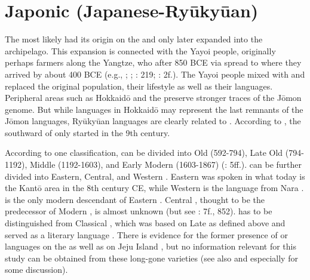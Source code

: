 \section{Japonic (Japanese-Ryūkyūan)}\label{sec:2.6}

The   most likely had its origin on the  and only later expanded into the  archipelago. This expansion is connected with the Yayoi people, originally perhaps farmers along the Yangtze, who after 850 BCE via  spread to  where they arrived by about 400 BCE (e.g., \citealt{Janhunen2003e}; \citealt{LeeHasegawa2011}; \citealt{MatsumuraOxenham2013}: 219; \citealt{Siska2017}: 2f.). The Yayoi people mixed with and replaced the original  population, their  lifestyle as well as their languages. Peripheral areas such as Hokkaid\=o and the  preserve stronger traces of the J\=omon genome. But while  languages in Hokkaid\=o may represent the last remnants of the J\=omon languages, Ryūkyūan languages are clearly related to . According to \citet[202]{Vovin2013a}, the southward  of  only started in the 9th century.

According to one classification,  can be divided into Old (592-794), Late Old (794-1192), Middle (1192-1603), and Early Modern  (1603-1867) (\citealt{Hasegawa2015}: 5ff.).  can be further divided into Eastern, Central, and Western . Eastern  was spoken in what today is the Kant\=o area in the 8th century CE, while Western  is the language from Nara \citep{Kupchik2011}.  is the only modern descendant of Eastern  \citep[9]{Kupchik2011}. Central , thought to be the predecessor of Modern , is almost unknown (but see \citealt{Kupchik2011}: 7f., 852).  has to be distinguished from Classical , which was based on Late  as defined above and served as a literary language \citep{Tranter2012b}. There is evidence for the former presence of  or  languages on the  as well as on Jeju Island \citep{Vovin2013b}, but no information relevant for this study can be obtained from these long-gone varieties (see also \citealt{Beckwith2007} and especially \citealt{Pellard2005} for some discussion).

